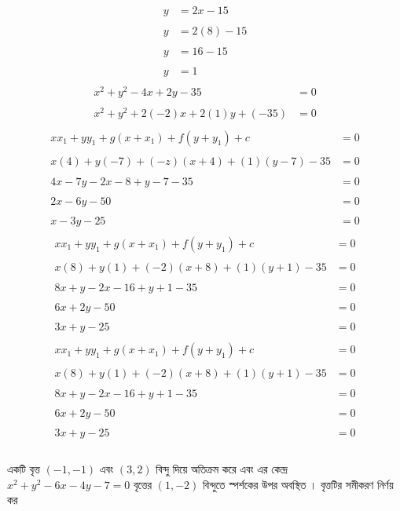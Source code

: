 \documentclass{article}
\begin{document}
\begin{align*}
y&=2x-15\\
\\
y&=2(8)-15\\
\\
y&=16-15\\
\\
y&=1\\
\end{align*}
\begin{align*}
x^2+y^2-4x+2y-35&=0\\
\\
x^2+y^2+2(-2)x+2(1)y+(-35)&=0\\
\end{align*}
\begin{align*}
xx_1+yy_1+g(x+x_1)+f(y+y_1)+c&=0\\
\\
x(4)+y(-7)+(-z)(x+4)+(1)(y-7)-35&=0\\
\\
4x-7y-2x-8+y-7-35&=0\\
\\
2x-6y-50&=0\\
\\
x-3y-25&=0\\
\end{align*}
\begin{align*}
xx_1+yy_1+g(x+x_1)+f(y+y_1)+c&=0\\
\\
x(8)+y(1)+(-2)(x+8)+(1)(y+1)-35&=0\\
\\
8x+y-2x-16+y+1-35&=0\\
\\
6x+2y-50&=0\\
\\
3x+y-25&=0\\
\end{align*}
\begin{align*}
xx_1+yy_1+g(x+x_1)+f(y+y_1)+c&=0\\
\\
x(8)+y(1)+(-2)(x+8)+(1)(y+1)-35&=0\\
\\
8x+y-2x-16+y+1-35&=0\\
\\
6x+2y-50&=0\\
\\
3x+y-25&=0\\
\end{align*}
\\
 একটি বৃত্ত $(-1,-1)$ এবং $(3,2)$ বিন্দু দিয়ে অতিক্রম করে এবং এর কেন্দ্র $x^2+y^2-6x-4y-7=0$ বৃত্তের $(1,-2)$ বিন্দুতে স্পর্শকের উপর অবস্থিত । বৃত্তটির সমীকরণ নির্ণয় কর \\ 
\end{document}
